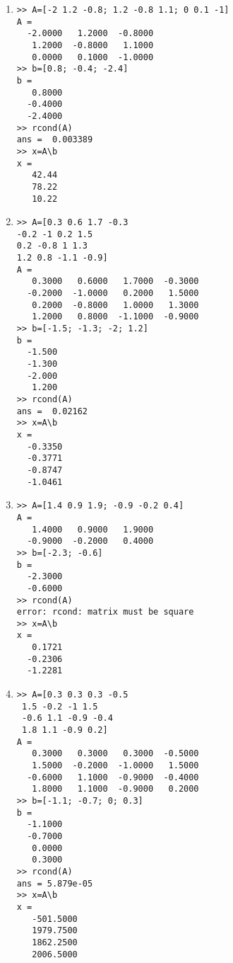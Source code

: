 \begin{exercise}
\begin{enumerate}
\item
\begin{verbatim}
>> A=[-2 1.2 -0.8; 1.2 -0.8 1.1; 0 0.1 -1]
A =
  -2.0000   1.2000  -0.8000
   1.2000  -0.8000   1.1000
   0.0000   0.1000  -1.0000
>> b=[0.8; -0.4; -2.4]
b =
   0.8000
  -0.4000
  -2.4000
>> rcond(A)
ans =  0.003389
>> x=A\b
x =
   42.44
   78.22
   10.22
\end{verbatim}



\item 
\begin{verbatim}
>> A=[0.3 0.6 1.7 -0.3
-0.2 -1 0.2 1.5
0.2 -0.8 1 1.3
1.2 0.8 -1.1 -0.9]
A =
   0.3000   0.6000   1.7000  -0.3000
  -0.2000  -1.0000   0.2000   1.5000
   0.2000  -0.8000   1.0000   1.3000
   1.2000   0.8000  -1.1000  -0.9000
>> b=[-1.5; -1.3; -2; 1.2]
b =
  -1.500
  -1.300
  -2.000
   1.200
>> rcond(A)
ans =  0.02162
>> x=A\b
x =
  -0.3350
  -0.3771
  -0.8747
  -1.0461
\end{verbatim}

\item
\begin{verbatim}
>> A=[1.4 0.9 1.9; -0.9 -0.2 0.4]
A =
   1.4000   0.9000   1.9000
  -0.9000  -0.2000   0.4000
>> b=[-2.3; -0.6]
b =
  -2.3000
  -0.6000
>> rcond(A)
error: rcond: matrix must be square
>> x=A\b
x =
   0.1721
  -0.2306
  -1.2281
\end{verbatim}

\item 
\begin{verbatim}
>> A=[0.3 0.3 0.3 -0.5
 1.5 -0.2 -1 1.5
 -0.6 1.1 -0.9 -0.4
 1.8 1.1 -0.9 0.2]
A =
   0.3000   0.3000   0.3000  -0.5000
   1.5000  -0.2000  -1.0000   1.5000
  -0.6000   1.1000  -0.9000  -0.4000
   1.8000   1.1000  -0.9000   0.2000
>> b=[-1.1; -0.7; 0; 0.3]
b =
  -1.1000
  -0.7000
   0.0000
   0.3000
>> rcond(A)
ans = 5.879e-05
>> x=A\b
x =
   -501.5000
   1979.7500
   1862.2500
   2006.5000
\end{verbatim}


\end{enumerate}
\end{exercise}
